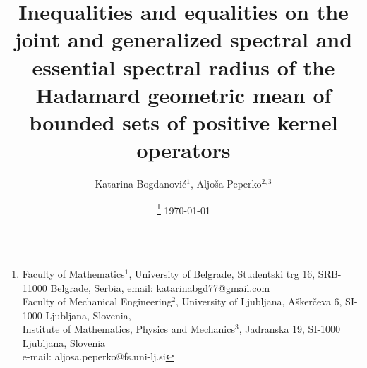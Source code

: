 \documentclass[12pt, reqno]{amsart}
\theoremstyle{definition}
\theoremstyle{remark}
\numberwithin{equation}{section}
\begin{document}
\setcounter{page}{1}

\title[Inequalities and equalities on the joint and generalized spectral radius]{Inequalities and equalities on the joint and generalized spectral and essential spectral radius  of the Hadamard geometric mean of bounded sets of positive kernel operators}

\author{ Katarina Bogdanovi\'{c}$^{1}$, Aljo\v{s}a Peperko$^{2,3}$}
\date{\thanks{
Faculty of Mathematics$^1$,
University of Belgrade,
Studentski trg 16,
SRB-11000 Belgrade, Serbia,
email:   katarinabgd77@gmail.com \\
Faculty of Mechanical Engineering$^2$,
University of Ljubljana,
A\v{s}ker\v{c}eva 6,
SI-1000 Ljubljana, Slovenia,\\
Institute of Mathematics, Physics and Mechanics$^3$,
Jadranska 19,
SI-1000 Ljubljana, Slovenia \\
e-mail:   aljosa.peperko@fs.uni-lj.si
} \today}





\end{document}
